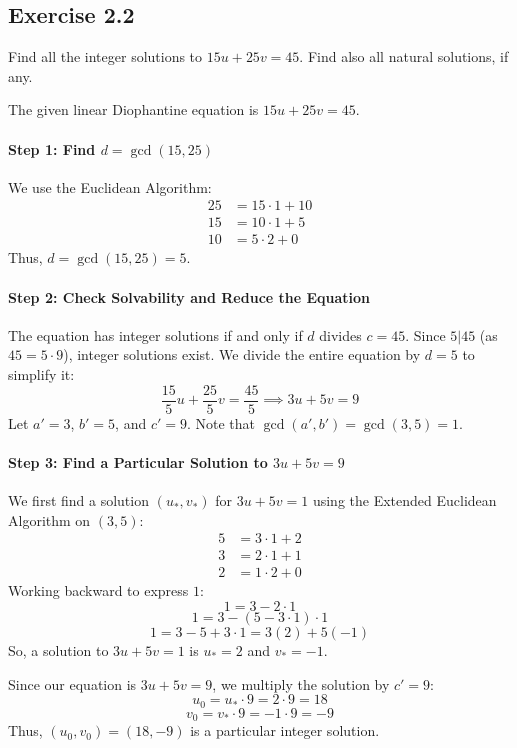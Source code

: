 \subsection*{Exercise 2.2}
Find all the integer solutions to $15u+25v=45$. Find also all natural solutions, if any.

\begin{solution}
The given linear Diophantine equation is $15u+25v=45$.

\paragraph{Step 1: Find $d = \gcd(15, 25)$}
We use the Euclidean Algorithm:
\begin{align*}
    25 &= 15 \cdot 1 + 10 \\
    15 &= 10 \cdot 1 + 5 \\
    10 &= 5 \cdot 2 + 0
\end{align*}
Thus, $d = \gcd(15, 25) = 5$.

\paragraph{Step 2: Check Solvability and Reduce the Equation}
The equation has integer solutions if and only if $d$ divides $c=45$.
Since $5|45$ (as $45 = 5 \cdot 9$), integer solutions exist.
We divide the entire equation by $d=5$ to simplify it:
$$ \frac{15}{5}u + \frac{25}{5}v = \frac{45}{5} \implies 3u + 5v = 9 $$
Let $a' = 3$, $b' = 5$, and $c' = 9$. Note that $\gcd(a', b') = \gcd(3, 5) = 1$.

\paragraph{Step 3: Find a Particular Solution to $3u+5v=9$}
We first find a solution $(u_*, v_*)$ for $3u+5v=1$ using the Extended Euclidean Algorithm on $(3, 5)$:
\begin{align*}
    5 &= 3 \cdot 1 + 2 \\
    3 &= 2 \cdot 1 + 1 \\
    2 &= 1 \cdot 2 + 0
\end{align*}
Working backward to express $1$:
$$1 = 3 - 2 \cdot 1$$
$$1 = 3 - (5 - 3 \cdot 1) \cdot 1$$
$$1 = 3 - 5 + 3 \cdot 1 = 3(2) + 5(-1)$$
So, a solution to $3u+5v=1$ is $u_*=2$ and $v_*=-1$.

Since our equation is $3u+5v=9$, we multiply the solution by $c'=9$:
$$ u_0 = u_* \cdot 9 = 2 \cdot 9 = 18$$
$$ v_0 = v_* \cdot 9 = -1 \cdot 9 = -9$$
Thus, $(u_0, v_0) = (18, -9)$ is a particular integer solution.


\end{solution}
